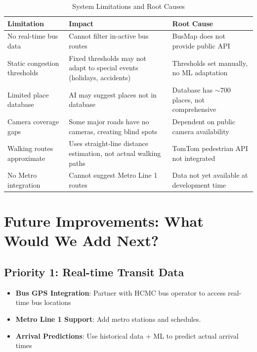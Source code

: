 \begin{table}[H]
    \centering
    \renewcommand{\arraystretch}{1.4}
    \begin{tabularx}{\textwidth}{|p{3.5cm}|p{4cm}|X|}
        \hline
        \textbf{Limitation} & \textbf{Impact} & \textbf{Root Cause} \\
        \hline
        No real-time bus data & Cannot filter in-active bus routes & BusMap does not provide public API \\
        \hline
        Static congestion thresholds & Fixed thresholds may not adapt to special events (holidays, accidents) & Thresholds set manually, no ML adaptation \\
        \hline
        Limited place database & AI may suggest places not in database & Database has $\sim$700 places, not comprehensive \\
        \hline
        Camera coverage gaps & Some major roads have no cameras, creating blind spots & Dependent on public camera availability \\
        \hline
        Walking routes approximate & Uses straight-line distance estimation, not actual walking paths & TomTom pedestrian API not integrated \\
        \hline
        No Metro integration & Cannot suggest Metro Line 1 routes & Data not yet available at development time \\
        \hline
    \end{tabularx}
    \caption{System Limitations and Root Causes}
\end{table}

\section{Future Improvements: What Would We Add Next?}

\subsection{Priority 1: Real-time Transit Data}
\begin{itemize}[noitemsep]
    \item \textbf{Bus GPS Integration}: Partner with HCMC bus operator to access real-time bus locations
    \item \textbf{Metro Line 1 Support}: Add metro stations and schedules.
    \item \textbf{Arrival Predictions}: Use historical data + ML to predict actual arrival times
\end{itemize}

